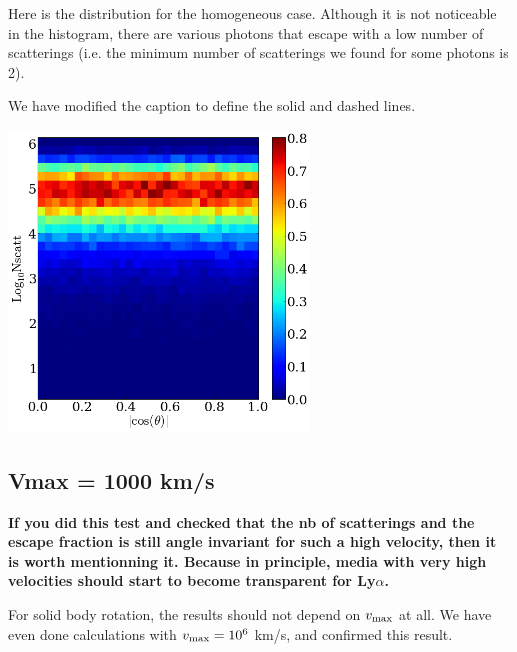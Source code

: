 \documentclass[12pt]{article}
\begin{document}
Here is the distribution for the homogeneous case. Although it is not
noticeable in the histogram, there are various photons that escape
with a low number of scatterings (i.e. the minimum number of
scatterings we found for some photons is 2). 

We have modified the caption to define the solid and dashed lines.

\begin{center}
\includegraphics[width=0.6\textwidth]{./f9h.png}
\end{center}

\subsection*{Vmax = 1000 km/s}
{\bf If you did this test and checked that the nb of scatterings and
  the escape fraction is still angle invariant for such a high
  velocity, then it is worth mentionning it. Because in principle,
  media with very high velocities should start to become transparent
  for Ly$\alpha$.}  

For solid body rotation, the results should not depend on $v_{\rm
  max}$ at all. We have even done calculations with $v_{\rm max}=10^6$
km/s, and confirmed this result. 
\end{document}
